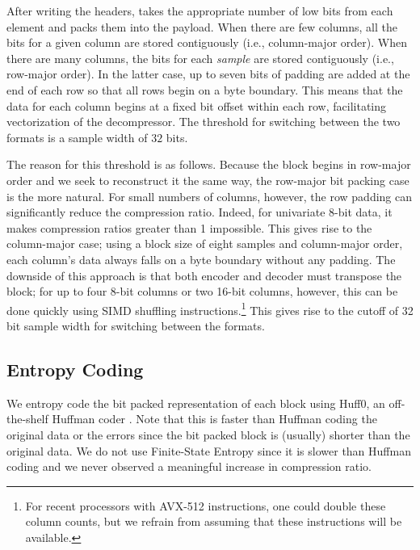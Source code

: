 After writing the headers, \minesp takes the appropriate number of low bits from each element and packs them into the payload. When there are few columns, all the bits for a given column are stored contiguously (i.e., column-major order). When there are many columns, the bits for each \textit{sample} are stored contiguously (i.e., row-major order). In the latter case, up to seven bits of padding are added at the end of each row so that all rows begin on a byte boundary. This means that the data for each column begins at a fixed bit offset within each row, facilitating vectorization of the decompressor. The threshold for switching between the two formats is a sample width of $32$ bits.

The reason for this threshold is as follows. Because the block begins in row-major order and we seek to reconstruct it the same way, the row-major bit packing case is the more natural. For small numbers of columns, however, the row padding can significantly reduce the compression ratio. Indeed, for univariate 8-bit data, it makes compression ratios greater than 1 impossible. This gives rise to the column-major case; using a block size of eight samples and column-major order, each column's data always falls on a byte boundary without any padding. The downside of this approach is that both encoder and decoder must transpose the block; for up to four 8-bit columns or two 16-bit columns, however, this can be done quickly using SIMD shuffling instructions.\footnote{For recent processors with AVX-512 instructions, one could double these column counts, but we refrain from assuming that these instructions will be available.} This gives rise to the cutoff of 32 bit sample width for switching between the formats.

\subsection{Entropy Coding}

We entropy code the bit packed representation of each block using Huff0, an off-the-shelf Huffman coder \cite{fse}. Note that this is faster than Huffman coding the original data or the errors since the bit packed block is (usually) shorter than the original data. We do not use Finite-State Entropy \cite{fse} since it is slower than Huffman coding and we never observed a meaningful increase in compression ratio.

